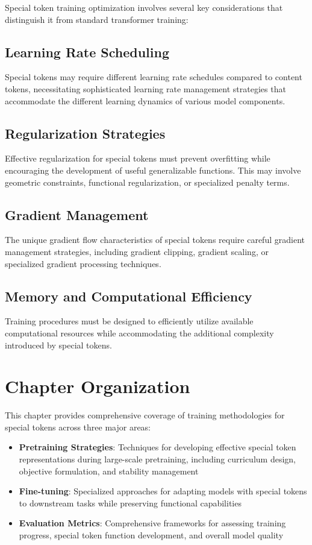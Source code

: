 Special token training optimization involves several key considerations that distinguish it from standard transformer training:

\subsection{Learning Rate Scheduling}

Special tokens may require different learning rate schedules compared to content tokens, necessitating sophisticated learning rate management strategies that accommodate the different learning dynamics of various model components.

\subsection{Regularization Strategies}

Effective regularization for special tokens must prevent overfitting while encouraging the development of useful generalizable functions. This may involve geometric constraints, functional regularization, or specialized penalty terms.

\subsection{Gradient Management}

The unique gradient flow characteristics of special tokens require careful gradient management strategies, including gradient clipping, gradient scaling, or specialized gradient processing techniques.

\subsection{Memory and Computational Efficiency}

Training procedures must be designed to efficiently utilize available computational resources while accommodating the additional complexity introduced by special tokens.

\section{Chapter Organization}

This chapter provides comprehensive coverage of training methodologies for special tokens across three major areas:

\begin{itemize}
\item \textbf{Pretraining Strategies}: Techniques for developing effective special token representations during large-scale pretraining, including curriculum design, objective formulation, and stability management
\item \textbf{Fine-tuning}: Specialized approaches for adapting models with special tokens to downstream tasks while preserving functional capabilities
\item \textbf{Evaluation Metrics}: Comprehensive frameworks for assessing training progress, special token function development, and overall model quality
\end{itemize}

